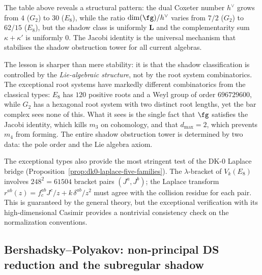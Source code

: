 \begin{remark}
\label{rem:exceptional-lesson}
The table above reveals a structural pattern: the dual Coxeter
number $h^\vee$ grows from $4$ ($G_2$) to $30$ ($E_8$), while
the ratio $\dim(\fg)/h^\vee$ varies from $7/2$ ($G_2$) to
$62/15$ ($E_8$), but the shadow class is uniformly
$\mathbf{L}$ and the complementarity sum $\kappa + \kappa'$
is uniformly $0$. The Jacobi identity is the universal mechanism
that stabilises the shadow obstruction tower for all current algebras.

The lesson is sharper than mere stability: it is that the
shadow classification is controlled by the \emph{Lie-algebraic
structure}, not by the root system combinatorics. The
exceptional root systems have markedly different combinatorics
from the classical types: $E_8$ has $120$ positive roots
and a Weyl group of order $696729600$, while
$G_2$ has a hexagonal root system with two distinct root
lengths, yet the bar complex sees none of this.
What it sees is the single fact that $\fg$ satisfies the
Jacobi identity, which kills $m_3$ on cohomology, and that
$d_{\max} = 2$, which prevents $m_4$ from forming. The
entire shadow obstruction tower is determined by two data: the pole order
and the Lie algebra axiom.

The exceptional types also provide the most stringent test of
the DK-0 Laplace bridge
(Proposition~\ref{prop:dk0-laplace-five-families}). The
$\lambda$-bracket of $V_k(E_8)$ involves $248^2 = 61504$
bracket pairs $(J^a, J^b)$; the Laplace transform
$r^{ab}(z) = f^{ab}_c J^c/z + k\,\delta^{ab}/z^2$ must agree
with the collision residue for each pair. This is guaranteed by
the general theory, but the exceptional verification with its
high-dimensional Casimir provides a nontrivial consistency check
on the normalization conventions.
\end{remark}


%
%

\subsection{Bershadsky--Polyakov: non-principal DS reduction
 and the subregular shadow}
\label{subsec:bershadsky-polyakov}

